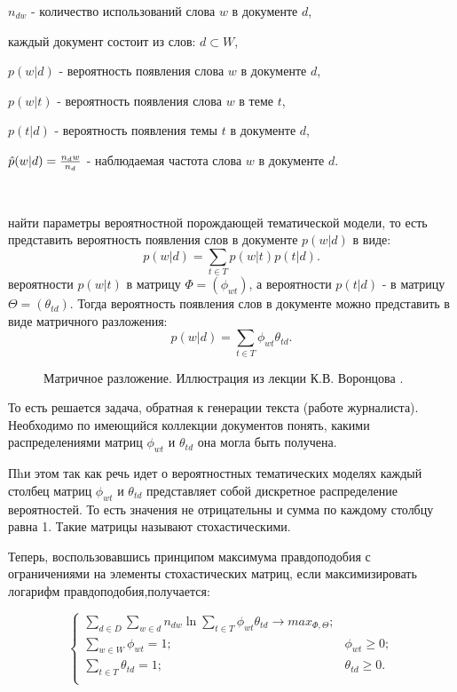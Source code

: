  $n_{dw}$ - количество использований слова $w$ в документе $d$,

 каждый документ состоит из слов: $d \subset W$,

 $p(w|d)$ - вероятность появления слова $w$ в документе $d$,

 $p(w|t)$ - вероятность появления слова $w$ в теме $t$,

 $p(t|d)$ - вероятность появления темы $t$ в документе $d$,

 $\hat{p}(w|d) = {{n_dw}\over{n_d}}$ - наблюдаемая частота слова $w$ в документе $d$.

~\

 найти параметры вероятностной порождающей тематической модели, то есть представить вероятность появления слов в документе $p(w|d)$ в виде:
\begin{equation}
p(w|d) = \sum_{t \in T}{ p(w|t) p(t|d) }.
\end{equation}
 вероятности $p(w|t)$ в матрицу $\Phi=(\phi_{wt})$, а вероятности $p(t|d)$ - в матрицу $\Theta=(\theta_{td})$. Тогда вероятность появления слов в документе можно представить в виде матричного разложения:
\begin{equation}
p(w|d) = \sum_{t \in T}{ \phi_{wt} \theta_{td} }.
\end{equation}

\begin{figure}[h]
\caption{Матричное разложение. Иллюстрация из лекции К.В. Воронцова .}
\label{fig:image}
\end{figure}


То есть решается задача, обратная к генерации текста (работе журналиста). Необходимо по имеющийся коллекции документов понять, какими распределениями матриц $\phi_{wt}$ и $\theta_{td}$ она могла быть получена.

Пhи этом так как речь идет о вероятностных тематических моделях каждый столбец матриц $\phi_{wt}$ и $\theta_{td}$ представляет собой дискретное распределение вероятностей. То есть значения не отрицательны и сумма по каждому столбцу равна 1. Такие матрицы называют стохастическими.

Теперь, воспользовавшись принципом максимума правдоподобия с ограничениями на элементы стохастических матриц, если максимизировать  логарифм правдоподобия,получается:

\begin{equation}
\begin{cases}
    \sum_{d \in D} \sum_{w \in d} n_{dw} \ln{\sum_{t \in T} \phi_{wt} \theta_{td} } \rightarrow max_{\Phi,\Theta};\\
    \sum_{w \in W}\phi_{wt} = 1; &\phi_{wt} \ge 0;\\
    \sum_{t \in T}\theta_{td} = 1; &\theta_{td} \ge 0.\\
\end{cases}
\end{equation}

